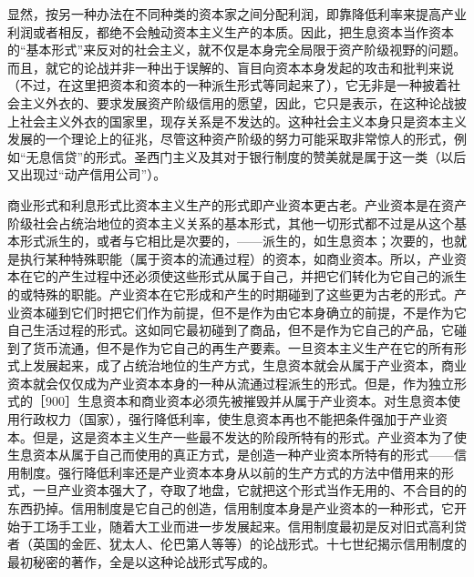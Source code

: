 显然，按另一种办法在不同种类的资本家之间分配利润，即靠降低利率来提高产业利润或者相反，都绝不会触动资本主义生产的本质。因此，把生息资本当作资本的“基本形式”来反对的社会主义，就不仅是本身完全局限于资产阶级视野的问题。而且，就它的论战并非一种出于误解的、盲目向资本本身发起的攻击和批判来说（不过，在这里把资本和资本的一种派生形式等同起来了），它无非是一种披着社会主义外衣的、要求发展资产阶级信用的愿望，因此，它只是表示，在这种论战披上社会主义外衣的国家里，现存关系是不发达的。这种社会主义本身只是资本主义发展的一个理论上的征兆，尽管这种资产阶级的努力可能采取非常惊人的形式，例如“无息信贷”的形式。圣西门主义及其对于银行制度的赞美就是属于这一类（以后又出现过“动产信用公司”）。


商业形式和利息形式比资本主义生产的形式即产业资本更古老。产业资本是在资产阶级社会占统治地位的资本主义关系的基本形式，其他一切形式都不过是从这个基本形式派生的，或者与它相比是次要的，——派生的，如生息资本；次要的，也就是执行某种特殊职能（属于资本的流通过程）的资本，如商业资本。所以，产业资本在它的产生过程中还必须使这些形式从属于自己，并把它们转化为它自己的派生的或特殊的职能。产业资本在它形成和产生的时期碰到了这些更为古老的形式。产业资本碰到它们时把它们作为前提，但不是作为由它本身确立的前提，不是作为它自己生活过程的形式。这如同它最初碰到了商品，但不是作为它自己的产品，它碰到了货币流通，但不是作为它自己的再生产要素。一旦资本主义生产在它的所有形式上发展起来，成了占统治地位的生产方式，生息资本就会从属于产业资本，商业资本就会仅仅成为产业资本本身的一种从流通过程派生的形式。但是，作为独立形式的［900］生息资本和商业资本必须先被摧毁并从属于产业资本。对生息资本使用行政权力（国家），强行降低利率，使生息资本再也不能把条件强加于产业资本。但是，这是资本主义生产一些最不发达的阶段所特有的形式。产业资本为了使生息资本从属于自己而使用的真正方式，是创造一种产业资本所特有的形式——信用制度。强行降低利率还是产业资本本身从以前的生产方式的方法中借用来的形式，一旦产业资本强大了，夺取了地盘，它就把这个形式当作无用的、不合目的的东西扔掉。信用制度是它自己的创造，信用制度本身是产业资本的一种形式，它开始于工场手工业，随着大工业而进一步发展起来。信用制度最初是反对旧式高利贷者（英国的金匠、犹太人、伦巴第人等等）的论战形式。十七世纪揭示信用制度的最初秘密的著作，全是以这种论战形式写成的。

